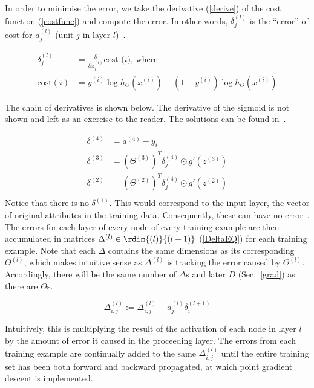 In order to minimise the error, we take the derivative (\ref{derive}) of the cost function (\ref{costfunc}) and compute the error.  In other words, $\delta_j^{(l)}$ is the ``error'' of cost for $a_j^{(l)}$ (unit $j$ in layer $l$)~\cite{Ng2011a}.

\begin{align}
  \delta_j^{(l)} &= \frac{\partial}{\partial z_j^{(l)}} \text{cost ($i$), where} \label{derive}\\
  \text{cost}(i) &= y^{(i)}\log h_\Theta(x^{(i)})+(1-y^{(i)})\log h_\Theta(x^{(i)}) \label{costfunc}
\end{align}

The chain of derivatives is shown below. The derivative of the sigmoid is not shown and left as an exercise to the reader. The solutions can be found in~\cite{Ng2011a}.

\begin{align*}
  \delta^{(4)} &= a^{(4)} - y_i \\
  \delta^{(3)} &= (\Theta^{(3)})^T \delta_j^{(4)} \odot g'(z^{(3)}) \\
  \delta^{(2)} &= (\Theta^{(2)})^T \delta_j^{(4)} \odot g'(z^{(2)}) \\
\end{align*}
Notice that there is no $\delta^{(1)}$. This would correspond to the input layer, the vector of original attributes in the training data. Consequently, these can have no error~\cite{Ng2011a}. The errors for each layer of every node of every training example are then accumulated in matrices $\Delta^{(l)} \in \rdim{(l)}{(l+1)}$ (\ref{DeltaEQ}) for each training example. Note that each $\Delta$ contains the same dimensions as its corresponding $\Theta^{(l)}$, which makes intuitive sense as $\Delta^{(l)}$ is tracking the error caused by $\Theta^{(l)}$. Accordingly, there will be the same number of $\Delta$s and later $D$ (Sec.~\ref{grad}) as there are $\Theta$s.

\begin{equation} \label{DeltaEQ}
  \Delta_{i,j}^{(l)} := \Delta_{i,j}^{(l)} + a_j^{(l)}\delta_i^{(l+1)}
\end{equation}

Intuitively, this is multiplying the result of the activation of each node in layer $l$  by the amount of error it caused in the proceeding layer. The errors from each training example are continually added to the same $\Delta_{i,j}^{(l)}$ until the entire training set has been both forward and backward propagated, at which point gradient descent is implemented.

